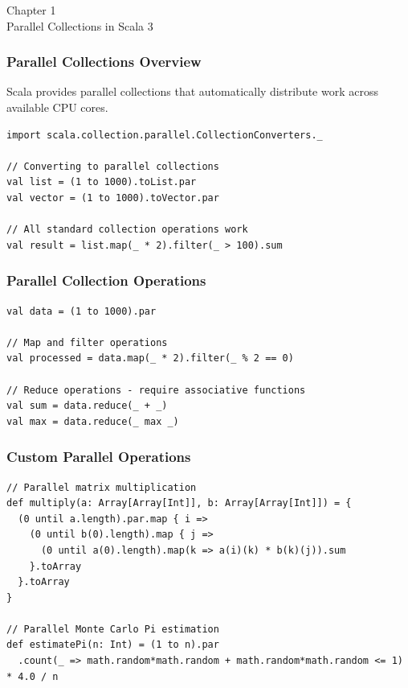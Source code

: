 \documentclass{beamer}
\newcommand{\chapterpage}[2]{
  \begin{frame}[plain]
    \centering
    \vfill
    {\usebeamerfont{title}\usebeamercolor[fg]{title}Chapter #1\\}
    \vspace{0.5cm}
    {\usebeamerfont{subtitle}#2}
    \vfill
  \end{frame}
}
\begin{document}
\chapterpage{1}{Parallel Collections in Scala 3}

\begin{frame}[fragile]
\frametitle{Parallel Collections Overview}

Scala provides parallel collections that automatically distribute work across available CPU cores.

\begin{lstlisting}[style=scalaStyle]
import scala.collection.parallel.CollectionConverters._

// Converting to parallel collections
val list = (1 to 1000).toList.par
val vector = (1 to 1000).toVector.par

// All standard collection operations work
val result = list.map(_ * 2).filter(_ > 100).sum
\end{lstlisting}

\end{frame}

\begin{frame}[fragile]
\frametitle{Parallel Collection Operations}

\begin{lstlisting}[style=scalaStyle]
val data = (1 to 1000).par

// Map and filter operations
val processed = data.map(_ * 2).filter(_ % 2 == 0)

// Reduce operations - require associative functions
val sum = data.reduce(_ + _)
val max = data.reduce(_ max _)
\end{lstlisting}

\end{frame}

\begin{frame}[fragile]
\frametitle{Custom Parallel Operations}

\begin{lstlisting}[style=scalaStyle]
// Parallel matrix multiplication
def multiply(a: Array[Array[Int]], b: Array[Array[Int]]) = {
  (0 until a.length).par.map { i =>
    (0 until b(0).length).map { j =>
      (0 until a(0).length).map(k => a(i)(k) * b(k)(j)).sum
    }.toArray
  }.toArray
}

// Parallel Monte Carlo Pi estimation
def estimatePi(n: Int) = (1 to n).par
  .count(_ => math.random*math.random + math.random*math.random <= 1) * 4.0 / n
\end{lstlisting}

\end{frame}
\end{document}
